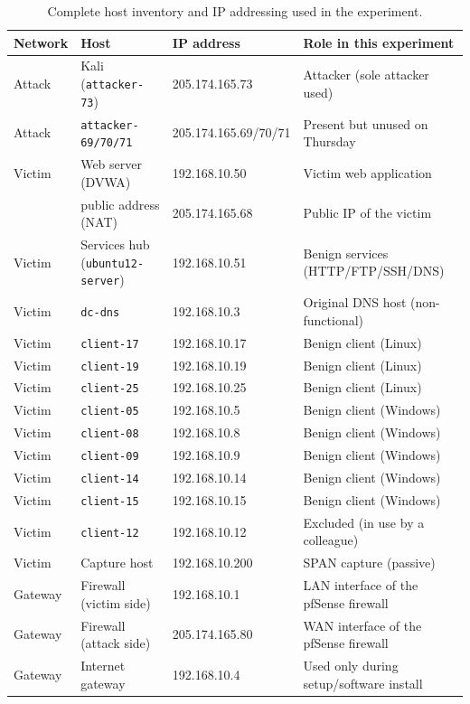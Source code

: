 \documentclass[11pt]{article}
\begin{document}
\begin{table}[h]
\centering
\caption{Complete host inventory and IP addressing used in the experiment.}
\label{tab:hosts}
\begin{tabular}{@{}llll@{}}
\toprule
Network & Host & IP address & Role in this experiment \\
\midrule
Attack  & Kali (\texttt{attacker-73})   & 205.174.165.73 & Attacker (sole attacker used) \\
Attack  & \texttt{attacker-69/70/71}    & 205.174.165.69/70/71 & Present but unused on Thursday \\
\midrule
Victim  & Web server (DVWA)             & 192.168.10.50 & Victim web application \\
        & \quad public address (NAT)    & 205.174.165.68 & Public IP of the victim \\
Victim  & Services hub (\texttt{ubuntu12-server}) & 192.168.10.51 & Benign services (HTTP/FTP/SSH/DNS) \\
Victim  & \texttt{dc-dns}               & 192.168.10.3  & Original DNS host (non-functional) \\
Victim  & \texttt{client-17}            & 192.168.10.17 & Benign client (Linux) \\
Victim  & \texttt{client-19}            & 192.168.10.19 & Benign client (Linux) \\
Victim  & \texttt{client-25}            & 192.168.10.25 & Benign client (Linux) \\
Victim  & \texttt{client-05}            & 192.168.10.5  & Benign client (Windows) \\
Victim  & \texttt{client-08}            & 192.168.10.8  & Benign client (Windows) \\
Victim  & \texttt{client-09}            & 192.168.10.9  & Benign client (Windows) \\
Victim  & \texttt{client-14}            & 192.168.10.14 & Benign client (Windows) \\
Victim  & \texttt{client-15}            & 192.168.10.15 & Benign client (Windows) \\
Victim  & \texttt{client-12}            & 192.168.10.12 & Excluded (in use by a colleague) \\
Victim  & Capture host                  & 192.168.10.200 & SPAN capture (passive) \\
\midrule
Gateway & Firewall (victim side)        & 192.168.10.1   & LAN interface of the pfSense firewall \\
Gateway & Firewall (attack side)        & 205.174.165.80 & WAN interface of the pfSense firewall \\
Gateway & Internet gateway              & 192.168.10.4   & Used only during setup/software install \\
\bottomrule
\end{tabular}
\end{table}
\end{document}
